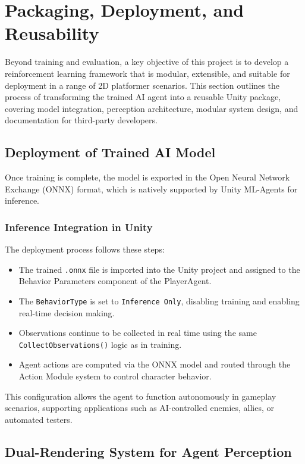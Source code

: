 \documentclass[12pt,oneside,openright,a4paper]{cpe-english-project}
\begin{document}
\section{Packaging, Deployment, and Reusability}

Beyond training and evaluation, a key objective of this project is to develop a reinforcement learning framework that is modular, extensible, and suitable for deployment in a range of 2D platformer scenarios. This section outlines the process of transforming the trained AI agent into a reusable Unity package, covering model integration, perception architecture, modular system design, and documentation for third-party developers.

\subsection{Deployment of Trained AI Model}

Once training is complete, the model is exported in the Open Neural Network Exchange (ONNX) format, which is natively supported by Unity ML-Agents for inference.

\subsubsection{Inference Integration in Unity}

The deployment process follows these steps:

\begin{itemize}
\item The trained \texttt{.onnx} file is imported into the Unity project and assigned to the Behavior Parameters component of the PlayerAgent.
\item The \texttt{BehaviorType} is set to \texttt{Inference Only}, disabling training and enabling real-time decision making.
\item Observations continue to be collected in real time using the same \texttt{CollectObservations()} logic as in training.
\item Agent actions are computed via the ONNX model and routed through the Action Module system to control character behavior.
\end{itemize}

This configuration allows the agent to function autonomously in gameplay scenarios, supporting applications such as AI-controlled enemies, allies, or automated testers.

\subsection{Dual-Rendering System for Agent Perception}
\end{document}
